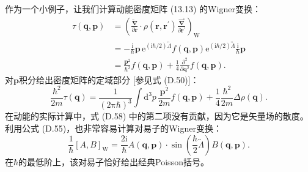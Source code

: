 作为一个小例子，让我们计算动能密度矩阵 (13.13) 的Wigner变换：
\begin{align}
\tau(\boldsymbol{q},\boldsymbol{p}) & =\left(\frac{\overleftarrow{\boldsymbol{\nabla}}}{\partial\boldsymbol{r}}\cdot\rho(\boldsymbol{r},\boldsymbol{r}^{\prime})\frac{\overrightarrow{\boldsymbol{\nabla}}}{\partial\boldsymbol{r}^{\prime}}\right)_{\text{W}}\nonumber \\
 & =-\frac{\mathrm{i}}{\hbar}\boldsymbol{p}\,\mathrm{e}^{(\mathrm{i}\hbar/2)\overleftrightarrow{\Lambda}}f(\boldsymbol{q},\boldsymbol{p})\mathrm{e}^{(\mathrm{i}\hbar/2)\overleftrightarrow{\Lambda}}\frac{\mathrm{i}}{\hbar}\boldsymbol{p}\nonumber \\
 & =\frac{\boldsymbol{p}^{2}}{\hbar^{2}}f(\boldsymbol{q},\boldsymbol{p})+\frac{1}{4}\frac{\partial^{2}}{\partial\boldsymbol{q}^{2}}f(\boldsymbol{q},\boldsymbol{p}).\label{eq:appendix_d_tau_wigner}
\end{align}
对$\boldsymbol{p}$积分给出密度矩阵的定域部分 {[}参见式 (D.50){]}：
\begin{equation}
\frac{\hbar^{2}}{2m}\tau(\boldsymbol{q})=\frac{1}{(2\mathrm{\pi}\hbar)^{3}}\int\mathrm{d}^{3}p\,\frac{\boldsymbol{p}^{2}}{2m}f(\boldsymbol{q},\boldsymbol{p})+\frac{1}{4}\frac{\hbar^{2}}{2m}\Delta\rho(\boldsymbol{q}).\label{eq:appendix_d_kinetic_energy_density}
\end{equation}
在动能的实际计算中，式 (D.58) 中的第二项没有贡献，因为它是矢量场的散度。利用公式 (D.55)，也非常容易计算对易子的Wigner变换：
\begin{equation}
\frac{1}{\hbar}[A,B]_{\text{W}}=\frac{2\mathrm{i}}{\hbar}A(\boldsymbol{q},\boldsymbol{p})\cdot\sin\left(\frac{\hbar}{2}\overleftrightarrow{\Lambda}\right)B(\boldsymbol{q},\boldsymbol{p}).\label{eq:appendix_d_commutator_wigner}
\end{equation}
在$\hbar$的最低阶上，该对易子恰好给出经典Poisson括号。

